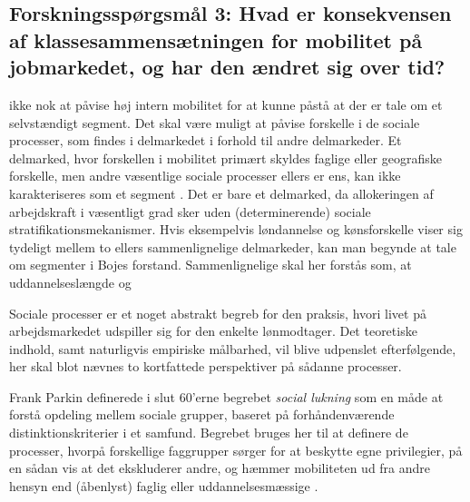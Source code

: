 \subsection[Forskningsspørgsmål 3]{Forskningsspørgsmål 3:  \linebreak
\small Hvad er konsekvensen af klassesammensætningen for mobilitet på jobmarkedet, og har den ændret sig over tid?}




ikke nok at påvise høj intern mobilitet for at kunne påstå at der er tale om et selvstændigt segment. Det skal være muligt at påvise forskelle i de sociale processer, som findes i delmarkedet i forhold til andre delmarkeder. Et delmarked, hvor forskellen i mobilitet primært skyldes faglige eller geografiske forskelle, men andre væsentlige sociale processer ellers er ens, kan ikke karakteriseres som et segment \parencite[41]{Boje1985}. Det er bare et delmarked, da allokeringen af arbejdskraft i væsentligt grad sker uden (determinerende) sociale stratifikationsmekanismer. Hvis eksempelvis løndannelse og kønsforskelle viser sig tydeligt mellem to ellers sammenlignelige delmarkeder, kan man begynde at tale om segmenter i Bojes forstand. Sammenlignelige skal her forstås som, at uddannelseslængde og 

Sociale processer er et noget abstrakt begreb for den praksis, hvori livet på arbejdsmarkedet udspiller sig for den enkelte lønmodtager. Det teoretiske indhold, samt naturligvis empiriske målbarhed, vil blive udpenslet efterfølgende, her skal blot nævnes to kortfattede perspektiver på sådanne processer.

Frank Parkin definerede i slut 60'erne begrebet \emph{social lukning} som en måde at forstå opdeling mellem sociale grupper, baseret på forhåndenværende distinktionskriterier i et samfund. Begrebet bruges her til at definere de processer, hvorpå forskellige faggrupper sørger for at beskytte egne privilegier, på en sådan vis at det ekskluderer andre, og hæmmer mobiliteten ud fra andre hensyn end (åbenlyst) faglig eller uddannelsesmæssige \parencite{Parkin1994}. 






